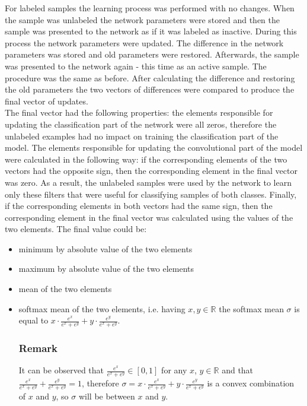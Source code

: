 \documentclass[a4paper,10pt]{report}
\begin{document}
      For labeled samples the learning process was performed with no changes. When the sample was unlabeled the network parameters were stored and then the sample was presented to the network as if it was labeled as inactive. During this process the network parameters were updated. The difference in the network parameters was stored and old parameters were restored. Afterwards, the sample was presented to the network again - this time as an active sample. The procedure was the same as before. After calculating the difference and restoring the old parameters the two vectors of differences were compared to produce the final vector of updates.\\
           
           
      The final vector had the following properties: the elements responsible for updating the classification part of the network were all zeros, therefore the unlabeled examples had no impact on training the classification part of the model. The elements responsible for updating the convolutional part of the model were calculated in the following way: if the corresponding elements of the two vectors had the opposite sign, then the corresponding element in the final vector was zero. As a result, the unlabeled samples were used by the network to learn only these filters that were useful for classifying samples of both classes. Finally, if the corresponding elements in both vectors had the same sign, then the corresponding element in the final vector was calculated using the values of the two elements. The final value could be:
      
      
      \begin{itemize}
       \item minimum by absolute value of the two elements
       \item maximum by absolute value of the two elements
       \item mean of the two elements
       \item softmax mean of the two elements, i.e. having $x, y \in \mathbb{R}$ the softmax mean $\sigma$ is equal to $x \cdot \frac{e^x}{e^x + e^y} + y \cdot \frac{e^y}{e^x + e^y}$.
       
       \subsubsection{Remark}
       It can be observed that $\frac{e^x}{e^x + e^y} \in [0, 1]$ for any $x$, $y \in \mathbb{R}$ and that $\frac{e^x}{e^x + e^y} + \frac{e^y}{e^x + e^y} = 1$, therefore $\sigma = x \cdot \frac{e^x}{e^x + e^y} + y \cdot \frac{e^y}{e^x + e^y}$ is a convex combination of $x$ and $y$, so $\sigma$ will be between $x$ and $y$.\\
      \end{itemize}
      
\end{document}
